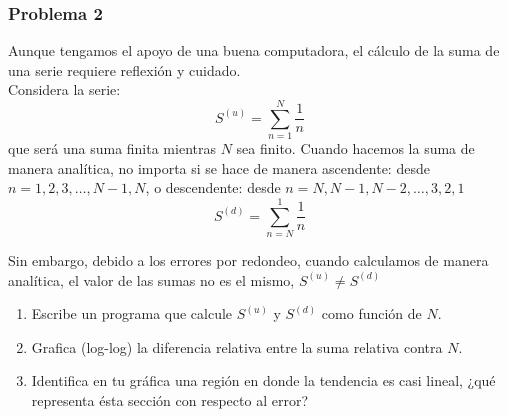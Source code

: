 \begin{frame}
\frametitle{Problema 2}
Aunque tengamos el apoyo de una buena computadora, el cálculo de la suma de una serie requiere reflexión y cuidado.
\\
Considera la serie:
\[S^{(u)} = \sum_{n=1}^{N} \dfrac{1}{n} \]
que será una suma finita mientras $N$ sea finito. Cuando hacemos la suma de manera analítica, no importa si se hace de manera ascendente: desde $n=1,2,3,\ldots,N-1,N$, o descendente: desde $n=N,N-1,N-2,\ldots,3,2,1$
\[S^{(d)} = \sum_{n=N}^{1} \dfrac{1}{n} \]
\end{frame}
\begin{frame}
Sin embargo, debido a los errores por redondeo, cuando calculamos de manera analítica, el valor de las sumas no es el mismo, $S^{(u)} \neq S^{(d)}$
\begin{enumerate}
\item Escribe un programa que calcule $S^{(u)}$ y $S^{(d)}$ como función de  $N$.
\item Grafica (log-log) la diferencia relativa entre la suma relativa contra $N$.
\item Identifica en tu gráfica una región en donde la tendencia es casi lineal, ¿qué representa ésta sección con respecto al error?
\end{enumerate}
\end{frame}
